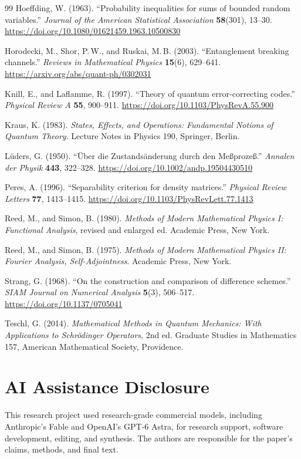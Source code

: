 \documentclass[11pt]{article}
\theoremstyle{definition}
\theoremstyle{remark}
\theoremstyle{plain}
\begin{document}
{\begin{thebibliography}{99}
Hoeffding, W. (1963). ``Probability inequalities for sums of bounded random
variables.'' \emph{Journal of the American Statistical Association}
\textbf{58}(301), 13--30. \url{https://doi.org/10.1080/01621459.1963.10500830}

Horodecki, M., Shor, P.\,W., and Ruskai, M.\,B. (2003). ``Entanglement breaking
channels.'' \emph{Reviews in Mathematical Physics} \textbf{15}(6), 629--641.
\url{https://arxiv.org/abs/quant-ph/0302031}

Knill, E., and Laflamme, R. (1997). ``Theory of quantum error-correcting
codes.'' \emph{Physical Review A} \textbf{55}, 900--911.
\url{https://doi.org/10.1103/PhysRevA.55.900}

Kraus, K. (1983). \emph{States, Effects, and Operations: Fundamental Notions of
Quantum Theory}. Lecture Notes in Physics 190, Springer, Berlin.

L\"uders, G. (1950). ``\"Uber die Zustands\"anderung durch den
Me{\ss}proze{\ss}.'' \emph{Annalen der Physik} \textbf{443}, 322--328.
\url{https://doi.org/10.1002/andp.19504430510}

Peres, A. (1996). ``Separability criterion for density matrices.''
\emph{Physical Review Letters} \textbf{77}, 1413--1415.
\url{https://doi.org/10.1103/PhysRevLett.77.1413}

Reed, M., and Simon, B. (1980). \emph{Methods of Modern Mathematical Physics I:
Functional Analysis}, revised and enlarged ed. Academic Press, New York.

Reed, M., and Simon, B. (1975). \emph{Methods of Modern Mathematical Physics
II: Fourier Analysis, Self-Adjointness}. Academic Press, New York.

Strang, G. (1968). ``On the construction and comparison of difference
schemes.'' \emph{SIAM Journal on Numerical Analysis} \textbf{5}(3), 506--517.
\url{https://doi.org/10.1137/0705041}

Teschl, G. (2014). \emph{Mathematical Methods in Quantum Mechanics: With
Applications to Schr\"odinger Operators}, 2nd ed. Graduate Studies in
Mathematics 157, American Mathematical Society, Providence.

\end{thebibliography}}

\section*{AI Assistance Disclosure}
This research project used research-grade commercial models, including
Anthropic's Fable and OpenAI's GPT-6 Astra, for research support, software
development, editing, and synthesis. The authors are responsible for the
paper's claims, methods, and final text.
\end{document}
